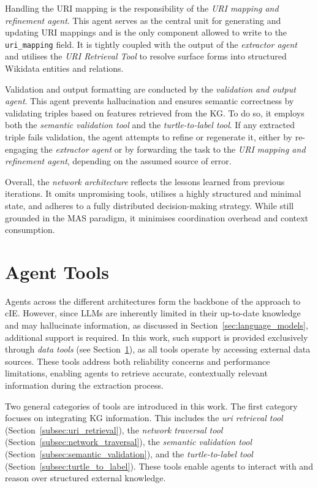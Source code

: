 \documentclass[a4paper,oneside,bibliography=totoc]{scrbook}
\begin{document}
Handling the \ac{URI} mapping is the responsibility of the \textit{\ac{URI} mapping and refinement agent}. This agent serves as the central unit for generating and updating \ac{URI} mappings and is the only component allowed to write to the \texttt{uri\_mapping} field. It is tightly coupled with the output of the \textit{extractor agent} and utilises the \textit{\ac{URI} Retrieval Tool} to resolve surface forms into structured Wikidata entities and relations.

Validation and output formatting are conducted by the \textit{validation and output agent}. This agent prevents hallucination and ensures semantic correctness by validating triples based on features retrieved from the \ac{KG}. To do so, it employs both the \textit{semantic validation tool} and the \textit{turtle-to-label tool}. If any extracted triple fails validation, the agent attempts to refine or regenerate it, either by re-engaging the \textit{extractor agent} or by forwarding the task to the \textit{\ac{URI} mapping and refinement agent}, depending on the assumed source of error.

Overall, the \textit{network architecture} reflects the lessons learned from previous iterations. It omits unpromising tools, utilises a highly structured and minimal state, and adheres to a fully distributed decision-making strategy. While still grounded in the \ac{MAS} paradigm, it minimises coordination overhead and context consumption.

\section{Agent Tools}
\label{sec:agent_tools}

Agents across the different architectures form the backbone of the approach to \ac{cIE}. However, since \acp{LLM} are inherently limited in their up-to-date knowledge and may hallucinate information, as discussed in Section~\ref{sec:language_models}, additional support is required. In this work, such support is provided exclusively through \textit{data tools} (see Section~\ref{sec:agent_tools}), as all tools operate by accessing external data sources. These tools address both reliability concerns and performance limitations, enabling agents to retrieve accurate, contextually relevant information during the extraction process.

Two general categories of tools are introduced in this work. The first category focuses on integrating \ac{KG} information. This includes the \textit{uri retrieval tool} (Section~\ref{subsec:uri_retrieval}), the \textit{network traversal tool} (Section~\ref{subsec:network_traversal}), the \textit{semantic validation tool} (Section~\ref{subsec:semantic_validation}), and the \textit{turtle-to-label tool} (Section~\ref{subsec:turtle_to_label}). These tools enable agents to interact with and reason over structured external knowledge.
\end{document}
